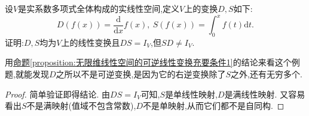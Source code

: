 \documentclass[../../main.tex]{subfiles}%
\begin{document}
\begin{example}
设\(V\)是实系数多项式全体构成的实线性空间,定义\(V\)上的变换\(D,S\)如下:
\[
D(f(x))=\frac{\mathrm{d}}{\mathrm{d}x}f(x),\ S(f(x))=\int_{0}^{x}f(t)\mathrm{d}t.
\]
证明:\(D,S\)均为\(V\)上的线性变换且\(DS = I_V\),但\(SD\neq I_V\).
\end{example}
\begin{remark}
用\hyperref[proposition:无限维线性空间的可逆线性变换充要条件1]{命题\ref{proposition:无限维线性空间的可逆线性变换充要条件1}}的结论来看这个例题,就能发现\(D\)之所以不是可逆变换,是因为它的右逆变换除了\(S\)之外,还有无穷多个.
\end{remark}
\begin{proof}
简单验证即得结论. 由\(DS = I_V\)可知,\(S\)是单线性映射,\(D\)是满线性映射. 又容易看出\(S\)不是满映射(值域不包含常数),\(D\)不是单映射,从而它们都不是自同构.
\end{proof}
\end{document}
